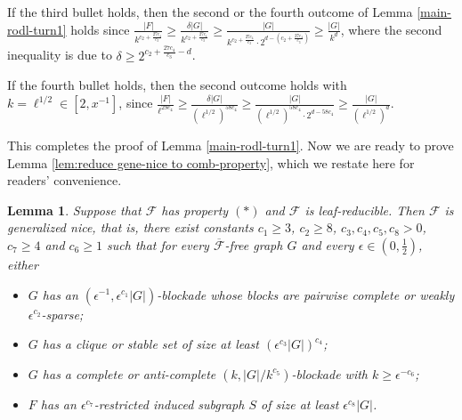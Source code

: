 \documentclass[a4paper,11pt]{article}
\newtheorem{lemma}[theorem]{Lemma}
\let\oldendproof\endproof
\renewenvironment{proof}[1][\proofname]{%
	\oldproof[\normalfont\bfseries #1]%
}{\oldendproof}
\begin{document}
\begin{proof}
        If the third bullet holds, then the second or the fourth outcome of Lemma \ref{main-rodl-turn1} holds since $\frac{|F|}{k^{c_2+\frac{27c_4}{c_3}}} \geq\frac{\delta|G|}{k^{c_2+\frac{27c_4}{c_3}}}\geq \frac{|G|}{k^{c_2+\frac{27c_4}{c_3}}\cdot 2^{d-(c_2+\frac{27c_4}{c_3})}}\geq \frac{|G|}{k^d}$, where the second inequality is due to $\delta\geq 2^{c_2+\frac{27c_4}{c_3}-d}$.

        
        If the fourth bullet holds, then the second outcome holds with $k=\ell^{1/2}\in[2,x^{-1}]$, since $\frac{|F|}{\ell^{29c_4}}\geq \frac{\delta|G|}{(\ell^{1/2})^{58c_4}}\geq \frac{|G|}{(\ell^{1/2})^{58c_4}\cdot 2^{d-58c_4}}\geq \frac{|G|}{(\ell^{1/2})^{d}}$. 

        This completes the proof of Lemma \ref{main-rodl-turn1}. 
    \end{proof}
    Now we are ready to prove Lemma \ref{lem:reduce gene-nice to comb-property}, which we restate here for readers' convenience. 

    \begin{lemma}\label{lem:main-impove-blockade-long-turn1}
        Suppose that $\mathcal{F}$ has property $(*)$ and $\mathcal{F}$ is leaf-reducible.  
        Then $\mathcal{F}$ is generalized nice, that is, 
        there exist constants $c_1\geq 3$, $c_2\geq 8$, $c_3,c_4,c_5,c_8>0$, $c_7\ge 4$ and $c_6\geq 1$ such that for every $\overline{\mathcal{F}}$-free graph $G$ and every $\epsilon\in(0,\frac{1}{2})$, either  
        \begin{itemize}
            \item[$(1)$] $G$ has an $(\epsilon^{-1},  \epsilon^{c_1}|G|)$-blockade whose blocks are pairwise complete or weakly $\epsilon^{c_2}$-sparse; 

            \item[$(2)$] $G$ has a clique or stable set of size at least $(\epsilon^{c_3}|G|)^{c_4}$;

            \item[$(3)$] $G$ has a complete or anti-complete $(k,|G|/k^{c_5})$-blockade with $k\geq \epsilon^{-c_6}$; 

            \item[$(4)$] $F$ has an $\epsilon^{c_7}$-restricted induced subgraph $S$ of size at least $\epsilon^{c_8}|G|$. 
        \end{itemize}
        
    \end{lemma}
    
\end{document}
